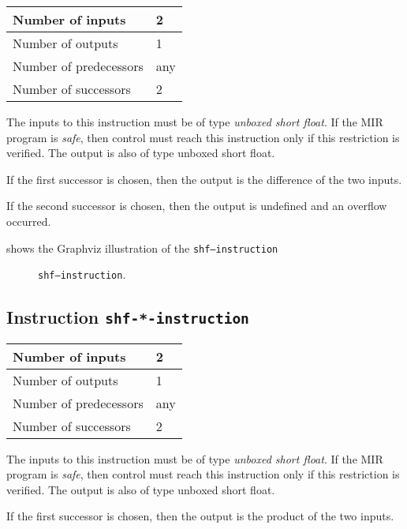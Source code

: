 \begin{tabular}{|l|l|}
\hline
Number of inputs & 2\\
\hline
Number of outputs & 1\\
\hline
Number of predecessors & any\\
\hline
Number of successors & 2\\
\hline
\end{tabular}

The inputs to this instruction must be of type \emph{unboxed short
  float}.  If the MIR program is \emph{safe}, then control must reach
this instruction only if this restriction is verified.  The output is
also of type unboxed short float.

If the first successor is chosen, then the output is
the difference of the two inputs.  

If the second successor is chosen, then the output is undefined and an
overflow occurred. 

 shows the Graphviz illustration of the
\texttt{shf---instruction}

\begin{figure}
\begin{center}
\end{center}
\caption{\label{fig-shf---instruction}
\texttt{shf---instruction}.}
\end{figure}

\subsection{Instruction \texttt{shf-*-instruction}}
\label{mir-instruction-shf-*}

\begin{tabular}{|l|l|}
\hline
Number of inputs & 2\\
\hline
Number of outputs & 1\\
\hline
Number of predecessors & any\\
\hline
Number of successors & 2\\
\hline
\end{tabular}

The inputs to this instruction must be of type \emph{unboxed short
  float}.  If the MIR program is \emph{safe}, then control must reach
this instruction only if this restriction is verified.  The output is
also of type unboxed short float.

If the first successor is chosen, then the output is
the product of the two inputs.  

